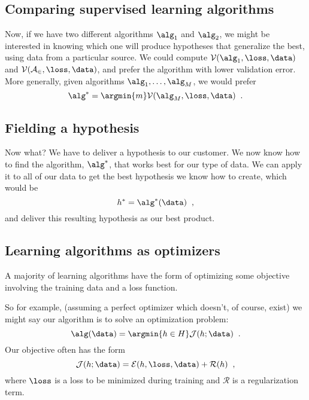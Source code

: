\subsection{Comparing supervised learning algorithms}
Now, if we have two different algorithms $\alg_1$  and
$\alg_2$, we might be interested in knowing which one will
produce hypotheses that generalize the best, using data from a
particular source.   We could compute 
$\mathcal{V}(\alg_1, \loss, \data)$ and
$\mathcal{V}(\mathcal{A_2}, \loss, \data)$, and prefer the
algorithm with lower validation error.  More generally, given
algorithms $\alg_1, \ldots, \alg_M$, we would prefer
\[\alg^* = \argmin{m} \mathcal{V}(\alg_M, \loss, \data)\;\;.\]

\subsection{Fielding a hypothesis}

Now what?  We have to deliver a hypothesis to our customer.
We now know how to find the algorithm, $\alg^*$, that works best for
our type of data.  We can apply it to all of our data to get the best
hypothesis we know how to create, which would be
\[h^* = \alg^*(\data)\;\;,\]
and deliver this resulting hypothesis as our best product.

\subsection{Learning algorithms as optimizers}
A majority of learning algorithms have the form of
optimizing some objective involving the training data and a loss
function.  

So for example, (assuming a perfect optimizer which doesn't, of
course, exist) we might say our algorithm is to solve an optimization
problem: 
\[\alg(\data) = \argmin{h \in H} \mathcal{J}(h; \data)\;\;.\]
Our objective often has the form 
  \[\mathcal{J}(h; \data) = \mathcal{E}(h,\loss, \data) +
    \mathcal{R}(h)\;\;,\]
  where $\loss$ is a loss to be minimized during training and
  $\mathcal{R}$ is a regularization term. 

